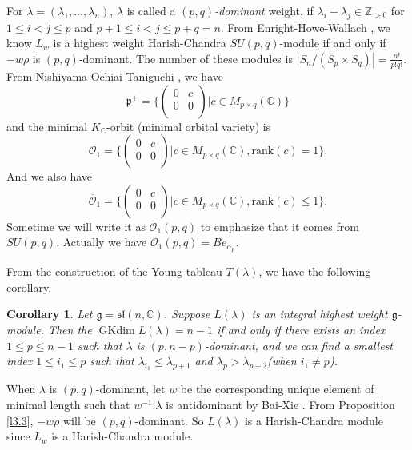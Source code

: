 \documentclass{amsart}[12pt]
\newtheorem{Cor}{Corollary}[section]
\newcommand{\gkd}{\operatorname{GKdim}}
\numberwithin{equation}{section}
\begin{document}
For $\lambda=(\lambda_1,...,\lambda_n)$, $ \lambda $ is called a \textit{$ (p,q) $-dominant} weight, if $ \lambda_i-\lambda_j\in\mathbb{Z}_{>0} $ for $ 1\leq i<j\leq p $ and $ p+1\leq i<j\leq p+q=n $. From Enright-Howe-Wallach \cite{EHW}, we know $L_w$ is a highest weight Harish-Chandra $SU(p,q)$-module if and only if $-w\rho $ is  $ (p,q) $-dominant. The number of these modules is $|S_n/(S_p\times S_q)|=\frac{n!}{p!q!}$. From Nishiyama-Ochiai-Taniguchi \cite{NOT}, we have
$$\mathfrak{p}^+=\{\left(
\begin{array}{cc}
0 & c \\
0 & 0 \\
\end{array}
\right)|c\in M_{p\times q}(\mathbb{C}) \}$$
and
 the minimal $K_{\mathbb{C}}$-orbit (minimal orbital variety) is $$\mathcal{O}_1=\{\left(
	\begin{array}{cc}
	0 & c \\
	0 & 0 \\
	\end{array}
	\right)|c\in M_{p\times q}(\mathbb{C}), \text{rank}(c)=1 \}.$$
	And we also have $$\overline{\mathcal{O}}_1=\{\left(
	\begin{array}{cc}
	0 & c \\
	0 & 0 \\
	\end{array}
	\right)|c\in M_{p\times q}(\mathbb{C}), \text{rank}(c)\leq 1 \}.$$
	Sometime we will write it as $\overline{\mathcal{O}}_1(p,q)$ to emphasize that it comes from $SU(p,q)$. Actually we have $\overline{\mathcal{O}}_1(p,q)=\overline{Be_{\alpha_{p}}}$.




From the construction of  the Young tableau $T(\lambda)$, we have the following corollary.


\begin{Cor}\label{pq}
Let $ \mathfrak{g}=\mathfrak{sl}(n,\mathbb{C}) $. Suppose $L(\lambda)$ is an integral highest weight $\mathfrak{g}$-module. Then  the $\gkd L(\lambda)=n-1$  if and only if   there exists an  index $1\leq p\leq n-1$ such that $\lambda$ is  $ (p,n-p) $-dominant, and we can find a smallest index $1\leq i_1\leq p$ such that $\lambda_{i_1}\leq \lambda_{p+1}$ and $\lambda_{p}>\lambda_{p+2}$(when $i_1\neq p$).
\end{Cor}

When $\lambda$ is $(p,q)$-dominant, let $w$ be the corresponding   unique element of minimal length such that $ w^{-1}.\lambda $ is antidominant by Bai-Xie \cite{BX}. From Proposition \ref{l3.3},  $-w\rho$ will be $(p,q)$-dominant. So $L(\lambda)$ is a Harish-Chandra module since $L_w$ is a Harish-Chandra module.
\end{document}
